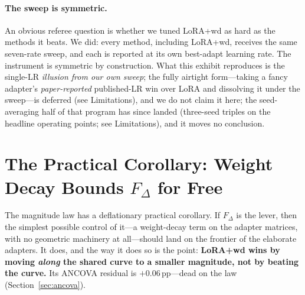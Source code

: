 \documentclass[11pt]{article}
\newcommand{\dw}{F_{\Delta}}
\begin{document}
\paragraph{The sweep is symmetric.} An obvious referee question is whether we tuned
LoRA{+}wd as hard as the methods it beats. We did: every method, including
LoRA{+}wd, receives the same seven-rate sweep, and each is reported at its own
best-adapt learning rate. The instrument is symmetric by construction. What this
exhibit reproduces is the single-LR \emph{illusion from our own sweep}; the fully
airtight form---taking a fancy adapter's \emph{paper-reported} published-LR win over
LoRA and dissolving it under the sweep---is deferred
(see Limitations), and we do not claim it here; the seed-averaging half
of that program has since landed (three-seed triples on the headline operating
points; see Limitations), and it moves no conclusion.

\section{The Practical Corollary: Weight Decay Bounds $\dw$ for Free}\label{sec:pareto}
The magnitude law has a deflationary practical corollary. If $\dw$ is the lever,
then the simplest possible control of it---a weight-decay term on the adapter
matrices, with no geometric machinery at all---should land on the frontier of the
elaborate adapters. It does, and the way it does so is the point:
\textbf{LoRA{+}wd wins by moving \emph{along} the shared curve to a smaller
magnitude, not by beating the curve.} Its ANCOVA residual is $+0.06$\,pp---dead on
the law (Section~\ref{sec:ancova}).
\end{document}
